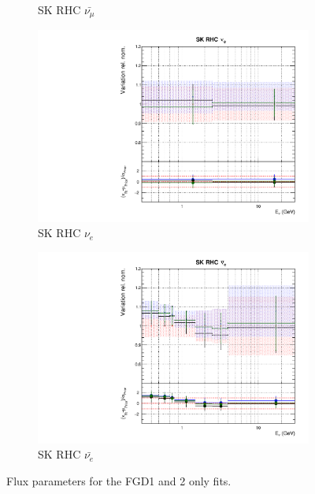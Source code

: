 \begin{figure}
\begin{subfigure}{0.24\textwidth}
  \caption{SK RHC $\bar{\nu_{\mu}}$}
\end{subfigure}
\begin{subfigure}{0.24\textwidth}
  \centering
  \includegraphics[width=0.95\linewidth]{figs/fgdfitsflux_14}
  \caption{SK RHC $\nu_{e}$}
\end{subfigure}
\begin{subfigure}{0.24\textwidth}
  \centering
  \includegraphics[width=0.95\linewidth]{figs/fgdfitsflux_15}
  \caption{SK RHC $\bar{\nu_e}$}
\end{subfigure}
\caption{Flux parameters for the FGD1 and 2 only fits.}
\label{fig:fgdflux}
\end{figure}

